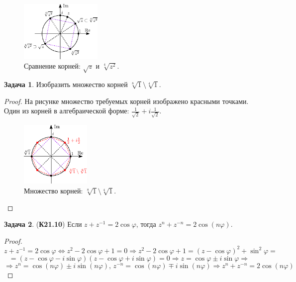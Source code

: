 \documentclass[12pt]{article}
\theoremstyle{definition}
\newtheorem{problem}{Задача}
\begin{document}
\begin{figure}[H]
	\centering
	\includegraphics[width=0.35\textwidth]{AL1S3_5.eps}
	\caption{Сравнение корней: $\sqrt{z}$ и $\sqrt[4]{z^2}$.}
	\label{AL1S3_5}
\end{figure}
\begin{problem}
	Изобразить множество корней $\sqrt[8]{1} \setminus \sqrt[4]{1}$.
\end{problem}
\begin{proof}
	На рисунке множество требуемых корней изображено красными точками. Один из корней в алгебраической форме: $\tfrac{1}{\sqrt{2}} + i\tfrac{1}{\sqrt{2}}$.
	\begin{figure}[H]
		\centering
		\includegraphics[width=0.3\textwidth]{AL1S3_6.eps}
		\caption{Множество корней: $\sqrt[8]{1} \setminus \sqrt[4]{1}$.}
		\label{AL1S3_6}
	\end{figure}
\end{proof}

\begin{problem}(\textbf{К21.10})
	Если $z + z^{-1} = 2\cos\varphi$, тогда $z^n + z^{-n} = 2\cos (n \varphi)$.
\end{problem}
\begin{proof}
	$$
		z + z^{-1} = 2\cos\varphi \Leftrightarrow z^2 - 2\cos\varphi + 1 =  0 \Rightarrow  z^2 - 2\cos\varphi + 1 = (z - \cos\varphi)^2  + \sin^2\varphi  = 
	$$
	$$
		= (z - \cos\varphi - i\sin\varphi)(z - \cos\varphi + i\sin\varphi) = 0 \Rightarrow z = \cos\varphi \pm i\sin\varphi \Rightarrow
	$$
	$$
		\Rightarrow z^n = \cos(n\varphi) \pm i\sin(n\varphi), \, z^{-n} = \cos(n\varphi) \mp i\sin(n\varphi) \Rightarrow z^n + z^{-n} = 2\cos(n\varphi)
	$$
\end{proof}
\end{document}
